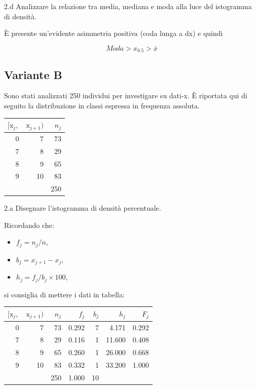 \documentclass[
  11pt,
]{book}
\providecommand{\tightlist}{%
  \setlength{\itemsep}{0pt}\setlength{\parskip}{0pt}}
\theoremstyle{mytheoremstyle}
\theoremstyle{mydefstyle}
\newenvironment{sol}
  {
  \begin{tcolorbox}[enhanced,breakable,arc=0.1mm,boxrule=1pt,colback=white,colframe=iblue,
  title=\bf \fontfamily{lmss}\selectfont \hspace{.5 cm} Soluzione,drop fuzzy shadow]

}{
\end{tcolorbox}
  }
\begin{document}
2.d Analizzare la relazione tra media, mediana e moda alla luce del istogramma di densità.

\begin{sol}
È presente un'evidente asimmetria positiva (coda lunga a dx) e quindi

\[Moda>x_{0.5}>\bar x\]

\end{sol}

\subsection{Variante B}\label{variante-b}

Sono stati analizzati 250 individui per investigare su dati-x. È riportata qui di seguito la distribuzione in classi espressa in frequenza assoluta.

\begin{table}[H]
\centering
\begin{tabular}{rrr}
\toprule
$[\text{x}_j,$ & $\text{x}_{j+1})$ & $n_j$\\
\midrule
0 & 7 & 73\\
7 & 8 & 29\\
8 & 9 & 65\\
9 & 10 & 83\\
 &  & 250\\
\bottomrule
\end{tabular}
\end{table}

2.a Disegnare l'istogramma di densità percentuale.

\begin{sol}

Ricordando che:

\begin{itemize}
\tightlist
\item
  \(f_j=n_j/n\),
\item
  \(b_j=x_{j+1}-x_{j}\),
\item
  \(h_j=f_j/b_j\times 100\),
\end{itemize}

si consiglia di mettere i dati in tabella:

\begin{table}[H]
\centering
\begin{tabular}{rrrrrrr}
\toprule
$[\text{x}_j,$ & $\text{x}_{j+1})$ & $n_j$ & $f_j$ & $b_j$ & $h_j$ & $F_j$\\
\midrule
0 & 7 & 73 & 0.292 & 7 & 4.171 & 0.292\\
7 & 8 & 29 & 0.116 & 1 & 11.600 & 0.408\\
8 & 9 & 65 & 0.260 & 1 & 26.000 & 0.668\\
9 & 10 & 83 & 0.332 & 1 & 33.200 & 1.000\\
 &  & 250 & 1.000 & 10 &  & \\
\bottomrule
\end{tabular}
\end{table}

\end{sol}
\end{document}
